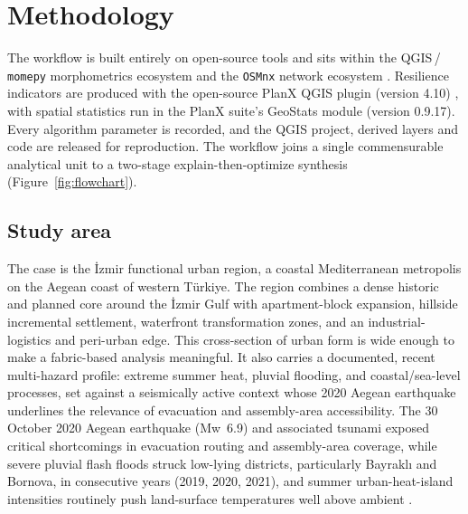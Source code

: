 \section{Methodology}
\label{sec:methods}

The workflow is built entirely on open-source tools and sits within the
QGIS\,/\,\texttt{momepy} morphometrics ecosystem
\citep{fleischmann2019MomepyUrban, fleischmann2022EvolutioUrban} and the
\texttt{OSMnx} network ecosystem \citep{boeing2017Osmnx, boeing2025ModelingNetworks}.
Resilience indicators are produced with the open-source PlanX QGIS plugin (version 4.10) \citep{eminoglu2026planxresilience}, with spatial statistics run in
the PlanX suite's GeoStats module (version 0.9.17). Every algorithm parameter is
recorded, and the QGIS project, derived layers and code are released for
reproduction. The workflow joins a single commensurable analytical unit to a
two-stage explain-then-optimize synthesis (Figure~\ref{fig:flowchart}).

\subsection{Study area}
\label{sec:study-area}

The case is the \.{I}zmir functional urban region, a coastal Mediterranean
metropolis on the Aegean coast of western T\"urkiye. The region combines a dense
historic and planned core around the \.{I}zmir Gulf with apartment-block
expansion, hillside incremental settlement, waterfront transformation zones, and
an industrial-logistics and peri-urban edge. This cross-section of urban form is wide
enough to make a fabric-based analysis meaningful. It also carries a documented,
recent multi-hazard profile: extreme summer heat, pluvial flooding, and
coastal/sea-level processes, set against a seismically active context whose 2020
Aegean earthquake underlines the relevance of evacuation and assembly-area
accessibility. The 30 October 2020 Aegean earthquake (Mw~6.9) and
associated tsunami exposed critical shortcomings in evacuation routing and
assembly-area coverage, while severe pluvial flash floods struck low-lying
districts, particularly Bayrakl\i{} and Bornova, in consecutive years (2019,
2020, 2021), and summer urban-heat-island intensities routinely push
land-surface temperatures well above ambient
\citep{canguzel2024ClimateChange}.

